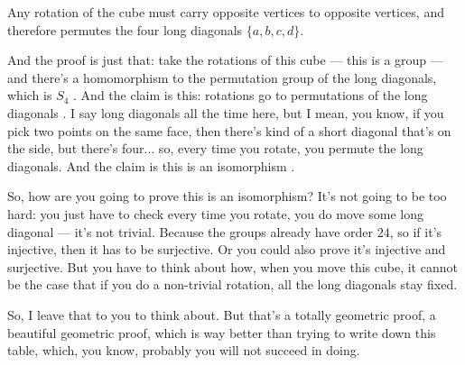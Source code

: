 \begin{content}
\begin{center}
\end{center}

Any rotation of the cube must carry opposite vertices to opposite vertices, and therefore permutes the four long diagonals $\{a, b, c, d\}$.
\end{content}

\begin{speech}[00:40:54 - 00:42:34]
And the proof is just that: take the rotations of this cube --- this is a group --- and there's a homomorphism to the permutation group of the long diagonals, which is $S_4$ . And the claim is this: rotations go to permutations of the long diagonals . I say long diagonals all the time here, but I mean, you know, if you pick two points on the same face, then there's kind of a short diagonal that's on the side, but there's four... so, every time you rotate, you permute the long diagonals. And the claim is this is an isomorphism .

So, how are you going to prove this is an isomorphism? It's not going to be too hard: you just have to check every time you rotate, you do move some long diagonal --- it's not trivial. Because the groups already have order $24$, so if it's injective, then it has to be surjective. Or you could also prove it's injective and surjective. But you have to think about how, when you move this cube, it cannot be the case that if you do a non-trivial rotation, all the long diagonals stay fixed.

So, I leave that to you to think about. But that's a totally geometric proof, a beautiful geometric proof, which is way better than trying to write down this table, which, you know, probably you will not succeed in doing.
\end{speech}

